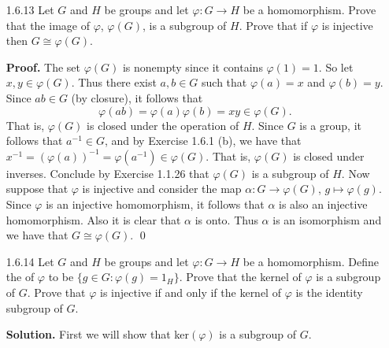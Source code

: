 \begin{enumerate}
      \textbf{Proof.} Proceed as we did in Exercise 1.6.11 with the following
      modification:
      $$f : G \times C \rightarrow A \times H,
        \quad((a, b), c) \mapsto (a, (b, c))$$ and 
      $$g : A \times H\rightarrow G\times C,
        \quad (a, (b, c)) \mapsto ((a, b), c).$$ \qed
   \item[1.6.13]  Let $G$ and $H$ be groups and let $\varphi : G \rightarrow H$
                  be a homomorphism. Prove that the image of $\varphi$,
                  $\varphi(G)$, is a subgroup of $H$. Prove that if $\varphi$ is
                  injective then $G \cong \varphi(G)$.

      \textbf{Proof.} The set $\varphi(G)$ is nonempty since it contains
      $\varphi(1) = 1$. So let $x, y \in \varphi(G)$. Thus there exist
      $a, b \in G$ such that $\varphi(a) = x$ and $\varphi(b) = y$. Since
      $ab \in G$ (by closure), it follows that
      $$\varphi(ab) = \varphi(a)\varphi(b) = xy \in \varphi(G).$$
      That is, $\varphi(G)$ is closed under the operation of $H$. Since $G$ is a
      group, it follows that $a^{-1} \in G$, and by Exercise 1.6.1 (b), we have
      that $x^{-1} = (\varphi(a))^{-1} = \varphi(a^{-1}) \in \varphi(G)$. That
      is, $\varphi(G)$ is closed under inverses. Conclude by Exercise 1.1.26
      that $\varphi(G)$ is a subgroup of $H$. Now suppose that $\varphi$ is
      injective and consider the map $\alpha : G \rightarrow \varphi(G)$,
      $g \mapsto \varphi(g)$. Since $\varphi$ is an injective homomorphism, it
      follows that $\alpha$ is also an injective homomorphism. Also it is clear
      that $\alpha$ is onto. Thus $\alpha$ is an isomorphism and we have that
      $G \cong \varphi(G)$. \qed
   \item[1.6.14]  Let $G$ and $H$ be groups and let $\varphi : G \rightarrow H$
                  be a homomorphism. Define the  of $\varphi$ to be
                  $\{g \in G : \varphi(g) = 1_H\}$. Prove that the kernel of
                  $\varphi$ is a subgroup of $G$. Prove that $\varphi$ is
                  injective if and only if the kernel of $\varphi$ is the
                  identity subgroup of $G$.

      \textbf{Solution.} First we will show that ker$(\varphi)$ is a subgroup of
      $G$.


\end{enumerate}
